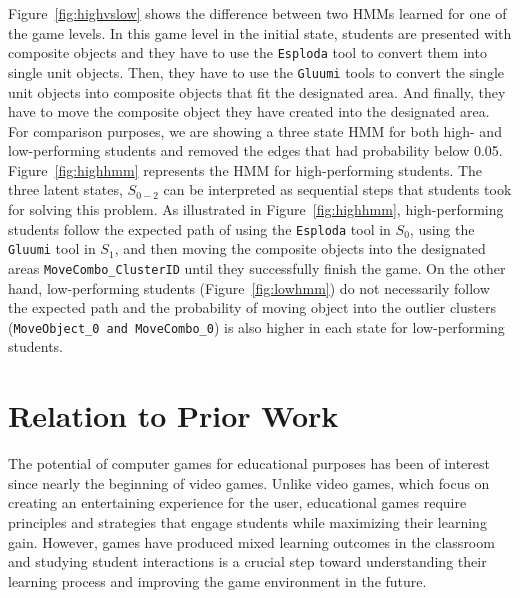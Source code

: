 \documentclass{sigchi}
\begin{document}
	Figure~\ref{fig:highvslow} shows the difference between two HMMs learned for one of the game levels.
	In this game level in the initial state, students are presented with composite objects and they have to use the \texttt{Esploda} tool to convert them into single unit objects. 
	Then, they have to use the \texttt{Gluumi} tools to convert the single unit objects into composite objects that fit the designated area. 
	And finally, they have to move the composite object they have created into the designated area.
	For comparison purposes, we are showing a three state HMM for both high- and low-performing students and removed the edges that had probability below 0.05. 
	Figure~\ref{fig:highhmm} represents the HMM for high-performing students. 
	The three latent states, $S_{0-2}$ can be interpreted as sequential steps that students took for solving this problem. As illustrated in Figure~\ref{fig:highhmm}, high-performing students follow the expected path of using the \texttt{Esploda} tool in $S_0$, using the \texttt{Gluumi} tool in $S_1$, and then moving the composite objects into the designated areas \texttt{MoveCombo\_{ClusterID}} until they successfully finish the game.
	On the other hand, low-performing students (Figure~\ref{fig:lowhmm}) do not necessarily follow the expected path and the probability of moving object into the outlier clusters (\texttt{MoveObject\_0 and MoveCombo\_0}) is also higher in each state for low-performing students.
	
	\section{Relation to Prior Work}
	\label{sec:priorwork}
	The potential of computer games for educational purposes has been of interest since nearly the beginning of video games. 
	Unlike video games, which focus on creating an entertaining experience for the user, educational games require principles and strategies that engage students while maximizing their learning gain. 
	However, games have produced mixed learning outcomes in the classroom \cite{harpstead2013search,mayo2009video} and studying student interactions is a crucial step toward understanding their learning process and improving the game environment in the future.
	
\end{document}
